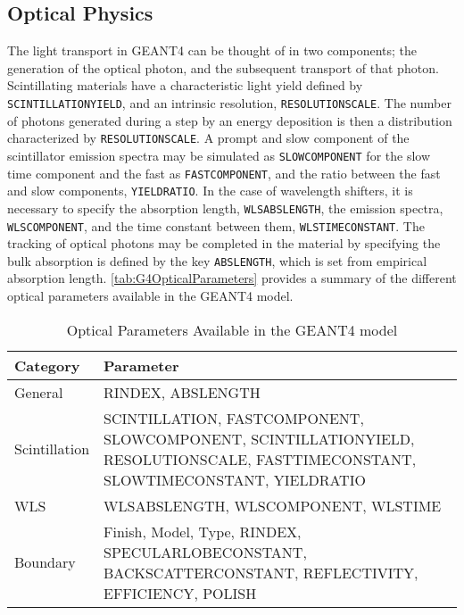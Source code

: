 \subsection{Optical Physics}
\label{sec:G4OpticalPhysicsAppendix}
The light transport in GEANT4 can be thought of in two components; the generation of the optical photon, and the subsequent transport of that photon.
Scintillating materials have a characteristic light yield defined by \verb+SCINTILLATIONYIELD+, and an intrinsic resolution, \verb+RESOLUTIONSCALE+.
The number of photons generated during a step by an energy deposition is then a distribution characterized by \verb+RESOLUTIONSCALE+.
A prompt and slow component of the scintillator emission spectra may be simulated as \verb+SLOWCOMPONENT+ for the slow time component and the fast as \verb+FASTCOMPONENT+, and the ratio between the fast and slow components, \verb+YIELDRATIO+.
In the case of wavelength shifters, it is necessary to specify the absorption length, \verb+WLSABSLENGTH+, the emission spectra, \verb+WLSCOMPONENT+, and the time constant between them, \verb+WLSTIMECONSTANT+.
The tracking of optical photons may be completed in the material by specifying the bulk absorption is defined by the key \verb+ABSLENGTH+, which is set from empirical absorption length.
\autoref{tab:G4OpticalParameters} provides a summary of the different optical parameters available in the GEANT4 model.
\begin{table}
	\caption[Optical Parameters Available in GEANT4]{Optical Parameters Available in the GEANT4 model}
	\label{tab:G4OpticalParameters}
	\begin{tabular}{p{2cm} | p{10cm}}
	\toprule
	Category & Parameter \\
	\midrule
	General & RINDEX, ABSLENGTH \\
	Scintillation & SCINTILLATION, FASTCOMPONENT, SLOWCOMPONENT, SCINTILLATIONYIELD, RESOLUTIONSCALE, FASTTIMECONSTANT, SLOWTIMECONSTANT, YIELDRATIO \\
	WLS & WLSABSLENGTH, WLSCOMPONENT, WLSTIME \\
	Boundary & Finish, Model, Type, RINDEX, SPECULARLOBECONSTANT, BACKSCATTERCONSTANT, REFLECTIVITY, EFFICIENCY, POLISH \\
	\bottomrule	
	\end{tabular}
\end{table}

